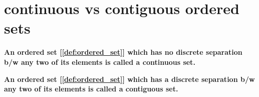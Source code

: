 \documentclass[../main.tex]{subfiles}
\begin{document}
\section{continuous vs contiguous ordered sets}

\begin{definition}
  \label{def:continuous_set}

  \textbf{An ordered set [\ref{def:ordered_set}] which has no discrete separation b/w any two of its elements is called a continuous set.}

\end{definition}

\begin{definition}
  \label{def:contiguous_set}

  \textbf{An ordered set [\ref{def:ordered_set}] which has a discrete separation b/w any two of its elements is called a contiguous set.}

\end{definition}
\end{document}
